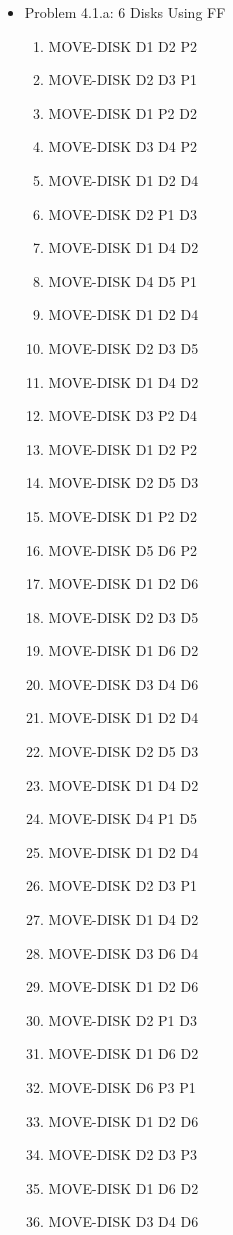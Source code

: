 \documentclass[12pt]{article}
\begin{document}
\begin{appendix}
  \begin{itemize}
    \item Problem 4.1.a: 6 Disks Using FF
	\begin{enumerate}
	\item  MOVE-DISK D1 D2 P2
	\item  MOVE-DISK D2 D3 P1
	\item  MOVE-DISK D1 P2 D2
	\item  MOVE-DISK D3 D4 P2
	\item  MOVE-DISK D1 D2 D4
	\item  MOVE-DISK D2 P1 D3
	\item  MOVE-DISK D1 D4 D2
	\item  MOVE-DISK D4 D5 P1
	\item  MOVE-DISK D1 D2 D4
	\item  MOVE-DISK D2 D3 D5
	\item  MOVE-DISK D1 D4 D2
	\item  MOVE-DISK D3 P2 D4
	\item  MOVE-DISK D1 D2 P2
	\item  MOVE-DISK D2 D5 D3
	\item  MOVE-DISK D1 P2 D2
	\item  MOVE-DISK D5 D6 P2
	\item  MOVE-DISK D1 D2 D6
	\item  MOVE-DISK D2 D3 D5
	\item  MOVE-DISK D1 D6 D2
	\item  MOVE-DISK D3 D4 D6
	\item  MOVE-DISK D1 D2 D4
	\item  MOVE-DISK D2 D5 D3
	\item  MOVE-DISK D1 D4 D2
	\item  MOVE-DISK D4 P1 D5
	\item  MOVE-DISK D1 D2 D4
	\item  MOVE-DISK D2 D3 P1
	\item  MOVE-DISK D1 D4 D2
	\item  MOVE-DISK D3 D6 D4
	\item  MOVE-DISK D1 D2 D6
	\item  MOVE-DISK D2 P1 D3
	\item  MOVE-DISK D1 D6 D2
	\item  MOVE-DISK D6 P3 P1
	\item  MOVE-DISK D1 D2 D6
	\item  MOVE-DISK D2 D3 P3
	\item  MOVE-DISK D1 D6 D2
	\item  MOVE-DISK D3 D4 D6

\end{enumerate}
\end{itemize}
\end{appendix}
\end{document}
